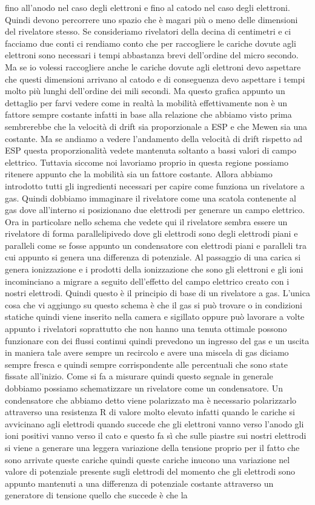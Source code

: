 {fino all'anodo nel caso degli elettroni e fino al catodo nel caso degli elettroni. Quindi devono percorrere uno spazio che è magari più o meno delle dimensioni del rivelatore stesso. Se consideriamo rivelatori della decina di centimetri e ci facciamo due conti ci rendiamo conto che per raccogliere le cariche dovute agli elettroni sono necessari i tempi abbastanza brevi dell'ordine del micro secondo. Ma se io volessi raccogliere anche le cariche dovute agli elettroni devo aspettare che questi dimensioni arrivano al catodo e di conseguenza devo aspettare i tempi molto più lunghi dell'ordine dei mili secondi. Ma questo grafica appunto un dettaglio per farvi vedere come in realtà la mobilità effettivamente non è un fattore sempre costante infatti in base alla relazione che abbiamo visto prima sembrerebbe che la velocità di drift sia proporzionale a ESP e che Mewen sia una costante. Ma se andiamo a vedere l'andamento della velocità di drift rispetto ad ESP questa proporzionalità vedete mantenuta soltanto a bassi valori di campo elettrico. Tuttavia siccome noi lavoriamo proprio in questa regione possiamo ritenere appunto che la mobilità sia un fattore costante. Allora abbiamo introdotto tutti gli ingredienti necessari per capire come funziona un rivelatore a gas. Quindi dobbiamo immaginare il rivelatore come una scatola contenente al gas dove all'interno si posizionano due elettrodi per generare un campo elettrico. Ora in particolare nello schema che vedete qui il rivelatore sembra essere un rivelatore di forma parallelipivedo dove gli elettrodi sono degli elettrodi piani e paralleli come se fosse appunto un condensatore con elettrodi piani e paralleli tra cui appunto si genera una differenza di potenziale. Al passaggio di una carica si genera ionizzazione e i prodotti della ionizzazione che sono gli elettroni e gli ioni incominciano a migrare a seguito dell'effetto del campo elettrico creato con i nostri elettrodi. Quindi questo è il principio di base di un rivelatore a gas. L'unica cosa che vi aggiungo su questo schema è che il gas si può trovare o in condizioni statiche quindi viene inserito nella camera e sigillato oppure può lavorare a volte appunto i rivelatori soprattutto che non hanno una tenuta ottimale possono funzionare con dei flussi continui quindi prevedono un ingresso del gas e un uscita in maniera tale avere sempre un recircolo e avere una miscela di gas diciamo sempre fresca e quindi sempre corrispondente alle percentuali che sono state fissate all'inizio. Come si fa a misurare quindi questo segnale in generale dobbiamo possiamo schematizzare un rivelatore come un condensatore. Un condensatore che abbiamo detto viene polarizzato ma è necessario polarizzarlo attraverso una resistenza R di valore molto elevato infatti quando le cariche si avvicinano agli elettrodi quando succede che gli elettroni vanno verso l'anodo gli ioni positivi vanno verso il cato e questo fa sì che sulle piastre sui nostri elettrodi si viene a generare una leggera variazione della tensione proprio per il fatto che sono arrivate queste cariche quindi queste cariche inucono una variazione nel valore di potenziale presente sugli elettrodi del momento che gli elettrodi sono appunto mantenuti a una differenza di potenziale costante attraverso un generatore di tensione quello che succede è che la }

